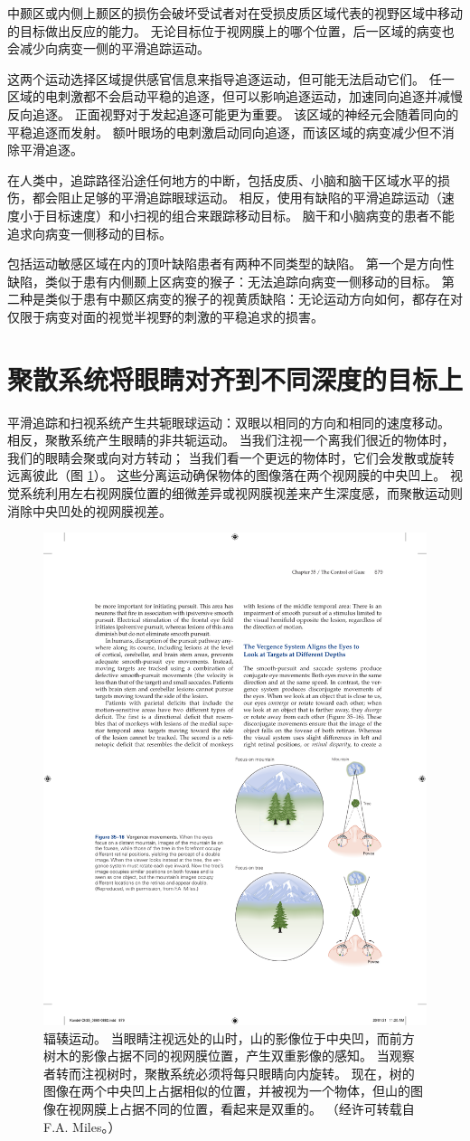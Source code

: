 中颞区或内侧上颞区的损伤会破坏受试者对在受损皮质区域代表的视野区域中移动的目标做出反应的能力。 无论目标位于视网膜上的哪个位置，后一区域的病变也会减少向病变一侧的平滑追踪运动。

这两个运动选择区域提供感官信息来指导追逐运动，但可能无法启动它们。 任一区域的电刺激都不会启动平稳的追逐，但可以影响追逐运动，加速同向追逐并减慢反向追逐。 正面视野对于发起追逐可能更为重要。 该区域的神经元会随着同向的平稳追逐而发射。 额叶眼场的电刺激启动同向追逐，而该区域的病变减少但不消除平滑追逐。

在人类中，追踪路径沿途任何地方的中断，包括皮质、小脑和脑干区域水平的损伤，都会阻止足够的平滑追踪眼球运动。 相反，使用有缺陷的平滑追踪运动（速度小于目标速度）和小扫视的组合来跟踪移动目标。 脑干和小脑病变的患者不能追求向病变一侧移动的目标。

包括运动敏感区域在内的顶叶缺陷患者有两种不同类型的缺陷。 第一个是方向性缺陷，类似于患有内侧颞上区病变的猴子：无法追踪向病变一侧移动的目标。 第二种是类似于患有中颞区病变的猴子的视黄质缺陷：无论运动方向如何，都存在对仅限于病变对面的视觉半视野的刺激的平稳追求的损害。


\section{聚散系统将眼睛对齐到不同深度的目标上}
平滑追踪和扫视系统产生共轭眼球运动：双眼以相同的方向和相同的速度移动。 相反，聚散系统产生眼睛的非共轭运动。 当我们注视一个离我们很近的物体时，我们的眼睛会聚或向对方转动； 
当我们看一个更远的物体时，它们会发散或旋转远离彼此（图 \ref{fig:35_16}）。 
这些分离运动确保物体的图像落在两个视网膜的中央凹上。 视觉系统利用左右视网膜位置的细微差异或视网膜视差来产生深度感，而聚散运动则消除中央凹处的视网膜视差。

\begin{figure}[htbp]
	\centering
	\includegraphics[width=0.65\linewidth]{chap35/fig_35_16}
	\caption{辐辏运动。 当眼睛注视远处的山时，山的影像位于中央凹，而前方树木的影像占据不同的视网膜位置，产生双重影像的感知。 当观察者转而注视树时，聚散系统必须将每只眼睛向内旋转。 现在，树的图像在两个中央凹上占据相似的位置，并被视为一个物体，但山的图像在视网膜上占据不同的位置，看起来是双重的。 （经许可转载自 F.A. Miles。）}
	\label{fig:35_16}
\end{figure}

